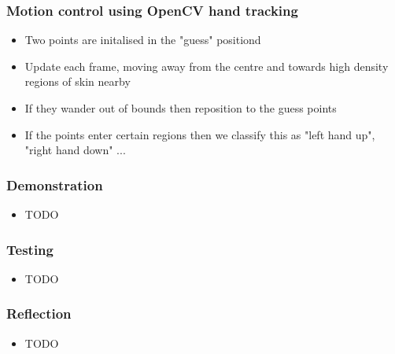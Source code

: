 \documentclass{beamer}
\begin{document}
\begin{frame}
\frametitle{Motion control using OpenCV {hand tracking}}
\begin{itemize}
	\item Two points are initalised in the "guess" positiond
	\item Update each frame, moving away from the centre and towards high density regions of skin nearby
	\item If they wander out of bounds then reposition to the guess points
	\item If the points enter certain regions then we classify this as "left hand up", "right hand down" ...
\end{itemize}
\end{frame}

\begin{frame}
\frametitle{Demonstration}
\begin{itemize}
	\item TODO
\end{itemize}
\end{frame}

\begin{frame}
\frametitle{Testing}
\begin{itemize}
	\item TODO
\end{itemize}
\end{frame}

\begin{frame}
\frametitle{Reflection}
\begin{itemize}
	\item TODO
\end{itemize}
\end{frame}
\end{document}

